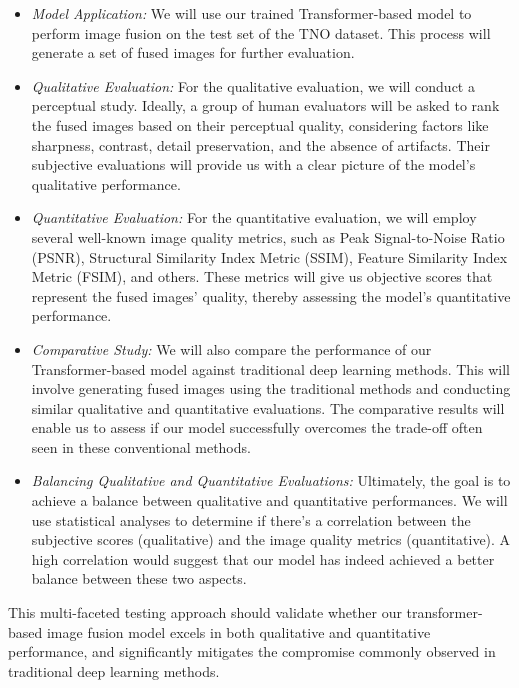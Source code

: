 \begin{itemize}
    \item \textit{Model Application:} We will use our trained Transformer-based model to perform image fusion on the test set of the TNO dataset. This process will generate a set of fused images for further evaluation.

    \item \textit{Qualitative Evaluation:} For the qualitative evaluation, we will conduct a perceptual study. Ideally, a group of human evaluators will be asked to rank the fused images based on their perceptual quality, considering factors like sharpness, contrast, detail preservation, and the absence of artifacts. Their subjective evaluations will provide us with a clear picture of the model's qualitative performance.

    \item \textit{Quantitative Evaluation:} For the quantitative evaluation, we will employ several well-known image quality metrics, such as Peak Signal-to-Noise Ratio (PSNR), Structural Similarity Index Metric (SSIM), Feature Similarity Index Metric (FSIM), and others. These metrics will give us objective scores that represent the fused images' quality, thereby assessing the model's quantitative performance.

    \item \textit{Comparative Study:} We will also compare the performance of our Transformer-based model against traditional deep learning methods. This will involve generating fused images using the traditional methods and conducting similar qualitative and quantitative evaluations. The comparative results will enable us to assess if our model successfully overcomes the trade-off often seen in these conventional methods.

    \item \textit{Balancing Qualitative and Quantitative Evaluations:} Ultimately, the goal is to achieve a balance between qualitative and quantitative performances. We will use statistical analyses to determine if there's a correlation between the subjective scores (qualitative) and the image quality metrics (quantitative). A high correlation would suggest that our model has indeed achieved a better balance between these two aspects.

\end{itemize}

This multi-faceted testing approach should validate whether our transformer-based image fusion model excels in both qualitative and quantitative performance, and significantly mitigates the compromise commonly observed in traditional deep learning methods.

